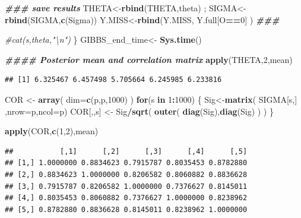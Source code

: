 \documentclass[12pt]{article}
\newenvironment{Shaded}{\begin{snugshade}}{\end{snugshade}}
\newcommand{\AttributeTok}[1]{\textcolor[rgb]{0.13,0.29,0.53}{#1}}
\newcommand{\CommentTok}[1]{\textcolor[rgb]{0.56,0.35,0.01}{\textit{#1}}}
\newcommand{\ControlFlowTok}[1]{\textcolor[rgb]{0.13,0.29,0.53}{\textbf{#1}}}
\newcommand{\DecValTok}[1]{\textcolor[rgb]{0.00,0.00,0.81}{#1}}
\newcommand{\DocumentationTok}[1]{\textcolor[rgb]{0.56,0.35,0.01}{\textbf{\textit{#1}}}}
\newcommand{\FunctionTok}[1]{\textcolor[rgb]{0.13,0.29,0.53}{\textbf{#1}}}
\newcommand{\NormalTok}[1]{#1}
\newcommand{\OtherTok}[1]{\textcolor[rgb]{0.56,0.35,0.01}{#1}}
\newcommand{\SpecialCharTok}[1]{\textcolor[rgb]{0.81,0.36,0.00}{\textbf{#1}}}
\begin{document}
\begin{Shaded}
\begin{Highlighting}[]
  \DocumentationTok{\#\#\# save results}
\NormalTok{  THETA}\OtherTok{\textless{}{-}}\FunctionTok{rbind}\NormalTok{(THETA,theta) ; SIGMA}\OtherTok{\textless{}{-}}\FunctionTok{rbind}\NormalTok{(SIGMA,}\FunctionTok{c}\NormalTok{(Sigma))}
\NormalTok{  Y.MISS}\OtherTok{\textless{}{-}}\FunctionTok{rbind}\NormalTok{(Y.MISS, Y.full[O}\SpecialCharTok{==}\DecValTok{0}\NormalTok{] )}
  \DocumentationTok{\#\#\#}

  \CommentTok{\#cat(s,theta,"\textbackslash{}n")}
\NormalTok{\}}
\NormalTok{GIBBS\_end\_time}\OtherTok{\textless{}{-}} \FunctionTok{Sys.time}\NormalTok{()}

\DocumentationTok{\#\#\#\# Posterior mean and correlation matrix}
\FunctionTok{apply}\NormalTok{(THETA,}\DecValTok{2}\NormalTok{,mean)}
\end{Highlighting}
\end{Shaded}

\begin{verbatim}
## [1] 6.325467 6.457498 5.705664 6.245985 6.233816
\end{verbatim}

\begin{Shaded}
\begin{Highlighting}[]
\NormalTok{COR }\OtherTok{\textless{}{-}} \FunctionTok{array}\NormalTok{( }\AttributeTok{dim=}\FunctionTok{c}\NormalTok{(p,p,}\DecValTok{1000}\NormalTok{) )}
\ControlFlowTok{for}\NormalTok{(s }\ControlFlowTok{in} \DecValTok{1}\SpecialCharTok{:}\DecValTok{1000}\NormalTok{)}
\NormalTok{\{}
\NormalTok{  Sig}\OtherTok{\textless{}{-}}\FunctionTok{matrix}\NormalTok{( SIGMA[s,] ,}\AttributeTok{nrow=}\NormalTok{p,}\AttributeTok{ncol=}\NormalTok{p)}
\NormalTok{  COR[,,s] }\OtherTok{\textless{}{-}}\NormalTok{ Sig}\SpecialCharTok{/}\FunctionTok{sqrt}\NormalTok{( }\FunctionTok{outer}\NormalTok{( }\FunctionTok{diag}\NormalTok{(Sig),}\FunctionTok{diag}\NormalTok{(Sig) ) )}
\NormalTok{\}}

\FunctionTok{apply}\NormalTok{(COR,}\FunctionTok{c}\NormalTok{(}\DecValTok{1}\NormalTok{,}\DecValTok{2}\NormalTok{),mean)}
\end{Highlighting}
\end{Shaded}

\begin{verbatim}
##           [,1]      [,2]      [,3]      [,4]      [,5]
## [1,] 1.0000000 0.8834623 0.7915787 0.8035453 0.8782880
## [2,] 0.8834623 1.0000000 0.8206582 0.8060882 0.8836628
## [3,] 0.7915787 0.8206582 1.0000000 0.7376627 0.8145011
## [4,] 0.8035453 0.8060882 0.7376627 1.0000000 0.8238962
## [5,] 0.8782880 0.8836628 0.8145011 0.8238962 1.0000000
\end{verbatim}
\end{document}
